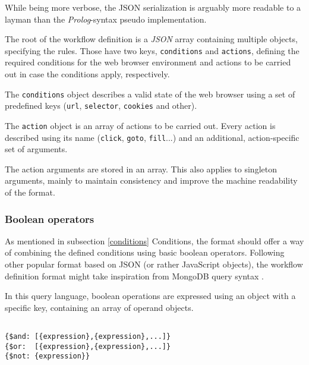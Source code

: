 \emptyline

While being more verbose, the JSON serialization is arguably more readable to a layman than the \textit{Prolog}-syntax pseudo implementation.

The root of the workflow definition is a \textit{JSON} array containing multiple objects, specifying the rules. 
Those have two keys, \texttt{conditions} and \texttt{actions}, defining the required conditions for the web browser environment and actions to be carried out in case the conditions apply, respectively.

The \texttt{conditions} object describes a valid state of the web browser using a set of predefined keys (\texttt{url}, \texttt{selector}, \texttt{cookies} and other).

The \texttt{action} object is an array of actions to be carried out. 
Every action is described using its name (\texttt{click}, \texttt{goto}, \texttt{fill}...) and an additional, action-specific set of arguments.

The action arguments are stored in an array. 
This also applies to singleton arguments, mainly to maintain consistency and improve the machine readability of the format.


\subsubsection{Boolean operators}
As mentioned in subsection \ref{conditions} Conditions, the format should offer a way of combining the defined conditions using basic boolean operators.
Following other popular format based on JSON (or rather JavaScript objects), the workflow definition format might take inspiration from MongoDB query syntax .

In this query language, boolean operations are expressed using an object with a specific key, containing an array of operand objects.

\begin{center}
\begin{minipage}{0.95\linewidth}
    \begin{verbatim}

{$and: [{expression},{expression},...]}
{$or:  [{expression},{expression},...]}
{$not: {expression}}
    \end{verbatim}
\end{minipage}
\end{center}

